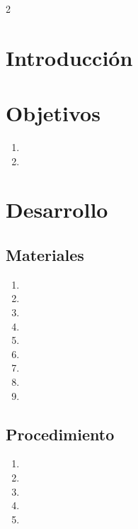 \documentclass[letterpaper,12pt]{extarticle}%
\begin{document}
    \begin{multicols}{2}
    \section{Introducción}
        
    \section{Objetivos}
    
    \begin{enumerate}
    \item 
    \item
    \end{enumerate}
		
	\section{Desarrollo}
	
	\subsection{Materiales}
	\begin{enumerate}
	    \item 
	    \item 
	    \item 
	    \item 
	    \item 
	    \item 
	    \item 
	    \item 
	    \item 
	\end{enumerate}
	
	\subsection{Procedimiento}
	\renewcommand{\labelenumi}{\arabic{enumi}.}
	\begin{enumerate}
		\item 
		
		\item 
		
		\item
		
		\item
		
		\item
		
	\end{enumerate}
    \end{multicols}
    
\end{document}

